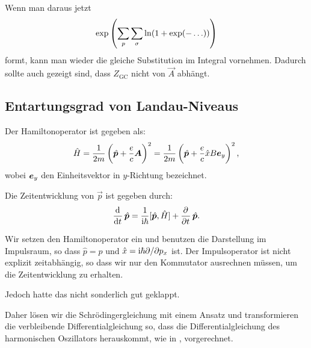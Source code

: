 Wenn man daraus jetzt
\[
    \exp\del{\sum_p \sum_\sigma \ln(1 + \exp(-\ldots))}
\]
formt, kann man wieder die gleiche Substitution im Integral vornehmen. Dadurch
sollte auch gezeigt sind, dass $Z_\text{GC}$ nicht von $\vec A$ abhängt.

\subsection{Entartungsgrad von Landau-Niveaus}

Der Hamiltonoperator ist gegeben als:
\[
    \hat H = \frac1{2m} \del{\hat{\vec p} + \frac ec \vec A}^2
    = \frac1{2m} \del{\hat{\vec p} + \frac ec \hat x B \ev_y}^2,
\]
wobei $\boldsymbol{e}_y$ den Einheitsvektor in $y$-Richtung bezeichnet.

Die Zeitentwicklung von $\vec p$ ist gegeben durch:
\[
    \dod{}t \hat{\vec p} = \frac1{\iup\hbar} [\hat{\vec p}, \hat H] + \dpd{}t \hat{\vec p}.
\]

Wir setzen den Hamiltonoperator ein und benutzen die Darstellung im Impulsraum,
so dass $\hat p = p$ und $\hat x = \mathrm i\hbar \partial/\partial p_x$ ist. Der
Impulsoperator ist nicht explizit zeitabhängig, so dass wir nur den Kommutator
ausrechnen müssen, um die Zeitentwicklung zu erhalten.

Jedoch hatte das nicht sonderlich gut geklappt.

Daher lösen wir die Schrödingergleichung mit einem Ansatz und transformieren
die verbleibende Differentialgleichung so, dass die Differentialgleichung des
harmonischen Oszillators herauskommt, wie in
\cite[Abschnitt~3.2.7]{nolting-theo6}, vorgerechnet.

